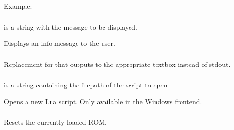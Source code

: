 \documentclass[letterpaper,10pt,english]{sphinxmanual}
\begin{document}
\sphinxAtStartPar
Example:

\begin{sphinxVerbatim}[commandchars=\\\{\}]
      
      
\end{sphinxVerbatim}


\subsubsection{}
\label{\detokenize{mods:emu-message-str}}\label{\detokenize{mods:message}}
\sphinxAtStartPar
{} is a string with the message to be displayed.

\sphinxAtStartPar
Displays an info message to the user.


\subsubsection{}
\label{\detokenize{mods:emu-print}}\label{\detokenize{mods:print}}
\sphinxAtStartPar
Replacement for  that outputs to the appropriate textbox instead of stdout.


\subsubsection{}
\label{\detokenize{mods:emu-openscript-filename}}\label{\detokenize{mods:openscript}}
\sphinxAtStartPar
{} is a string containing the filepath of the script to open.

\sphinxAtStartPar
Opens a new Lua script. Only available in the Windows frontend.


\subsubsection{}
\label{\detokenize{mods:emu-reset}}\label{\detokenize{mods:reset}}
\sphinxAtStartPar
Resets the currently loaded ROM.
\end{document}
